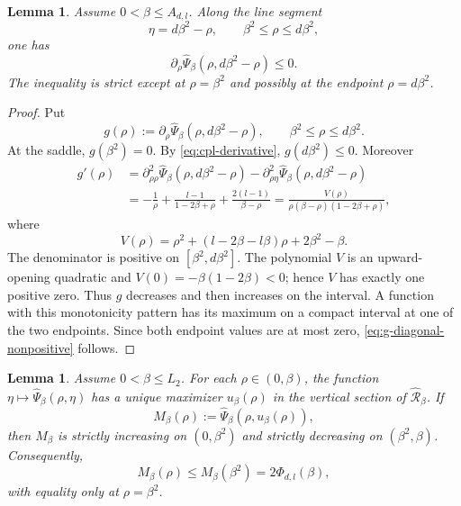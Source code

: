 \documentclass[11pt]{amsart}
\theoremstyle{plain}
\newtheorem{lemma}[theorem]{Lemma}
\numberwithin{equation}{section}
\numberwithin{theorem}{section}
\numberwithin{figure}{section}
\begin{document}
\begin{lemma}\label{lem:diagonal-derivative}
Assume \(0<\beta\le A_{d,l}\).  Along the line segment
\[
  \eta=d\beta^2-\rho,
  \qquad \beta^2\le \rho\le d\beta^2,
\]
one has
\begin{equation}\label{eq:g-diagonal-nonpositive}
  \partial_\rho\widehat\Psi_\beta(\rho,d\beta^2-\rho)\le0.
\end{equation}
The inequality is strict except at \(\rho=\beta^2\) and possibly at the endpoint
\(\rho=d\beta^2\).
\end{lemma}

\begin{proof}
Put
\[
  g(\rho):=\partial_\rho\widehat\Psi_\beta(\rho,d\beta^2-\rho),
  \qquad \beta^2\le\rho\le d\beta^2.
\]
At the saddle, \(g(\beta^2)=0\).  By \eqref{eq:cpl-derivative},
\(g(d\beta^2)\le0\).  Moreover
\begin{align*}
  g'(\rho)
  &=\partial_{\rho\rho}^2\widehat\Psi_\beta(\rho,d\beta^2-\rho)
    -\partial_{\rho\eta}^2\widehat\Psi_\beta(\rho,d\beta^2-\rho)\\
  &=-\frac1\rho+\frac{l-1}{1-2\beta+\rho}
    +\frac{2(l-1)}{\beta-\rho}
   =\frac{V(\rho)}{\rho(\beta-\rho)(1-2\beta+\rho)},
\end{align*}
where
\[
  V(\rho)=\rho^2+(l-2\beta-l\beta)\rho+2\beta^2-\beta.
\]
The denominator is positive on \([\beta^2,d\beta^2]\).  The polynomial \(V\) is an
upward-opening quadratic and \(V(0)=-\beta(1-2\beta)<0\); hence \(V\) has exactly one
positive zero.  Thus \(g\) decreases and then increases on the interval.  A function
with this monotonicity pattern has its maximum on a compact interval at one of the two
endpoints.  Since both endpoint values are at most zero, \eqref{eq:g-diagonal-nonpositive}
follows.
\end{proof}

\begin{lemma}\label{lem:vertical-reduction-L2}
Assume \(0<\beta\le L_2\).  For each \(\rho\in(0,\beta)\), the function
\(\eta\mapsto\widehat\Psi_\beta(\rho,\eta)\) has a unique maximizer
\(u_\beta(\rho)\) in the vertical section of \(\widehat{\mathcal R}_\beta\).  If
\[
  M_\beta(\rho):=\widehat\Psi_\beta(\rho,u_\beta(\rho)),
\]
then \(M_\beta\) is strictly increasing on \((0,\beta^2)\) and strictly decreasing on
\((\beta^2,\beta)\).  Consequently,
\[
  M_\beta(\rho)\le M_\beta(\beta^2)=2\Phi_{d,l}(\beta),
\]
with equality only at \(\rho=\beta^2\).
\end{lemma}
\end{document}
